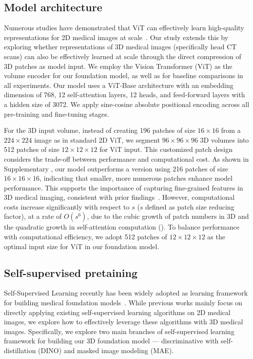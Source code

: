 \documentclass[fleqn,10pt]{wlscirep}
\begin{document}
\subsection*{Model architecture}
\label{sec:model_architecture}
Numerous studies have demonstrated that ViT can effectively learn high-quality representations for 2D medical images at scale~\cite{chen_towards_2024, zhou2023foundation, MedSAM, Vorontsov2024, Azizi2023}. Our study extends this by exploring whether representations of 3D medical images (specifically head CT scans) can also be effectively learned at scale through the direct compression of 3D patches as model input. We employ the Vision Transformer (ViT)\cite{dosovitskiy2020vit} as the volume encoder for our foundation model, as well as for baseline comparisons in all experiments. Our model uses a ViT-Base architecture with an embedding dimension of 768, 12 self-attention layers, 12 heads, and feed-forward layers with a hidden size of 3072. We apply sine-cosine absolute positional encoding\cite{NIPS2017_3f5ee243} across all pre-training and fine-tuning stages.

For the 3D input volume, instead of creating 196 patches of size $16 \times 16$ from a $224 \times 224$ image as in standard 2D ViT, we segment $96 \times 96 \times 96$ 3D volumes into 512 patches of size $12 \times 12 \times 12$ for ViT input. This customized patch design considers the trade-off between performance and computational cost. As shown in Supplementary , our model outperforms a version using 216 patches of size $16 \times 16 \times 16$, indicating that smaller, more numerous patches enhance model performance. This supports the importance of capturing fine-grained features in 3D medical imaging, consistent with prior findings~\cite{Tang_2022_CVPR, li2024well}. However, computational costs increase significantly with respect to $s$ ($s$ defined as patch size reducing factor), at a rate of $O(s^{6})$, due to the cubic growth of patch numbers in 3D and the quadratic growth in self-attention computation (). To balance performance with computational efficiency, we adopt 512 patches of $12 \times 12 \times 12$ as the optimal input size for ViT in our foundation model.



\subsection*{Self-supervised pretaining}
Self-Supervised Learning recently has been widely adopted as learning framework for building medical foundation models~\cite{chen_towards_2024, zhou2023foundation, Huang2023, azizi21big, Vorontsov2024}. While previous works mainly focus on directly applying existing self-supervised learning algorithms on 2D medical images, we explore how to effectively leverage these algorithms with 3D medical images. Specifically, we explore two main branches of self-supervised learning framework for building our 3D foundation model --- discriminative with self-distillation (DINO) and masked image modeling (MAE).
\end{document}
